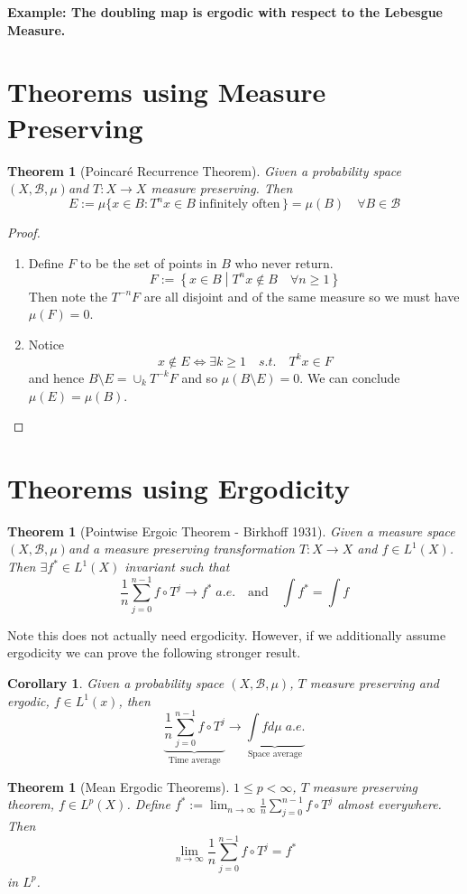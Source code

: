 \documentclass[11pt]{article}
\newcommand{\defeq}{:=}
\newcommand{\msrspc}{\ensuremath{(X,\mathcal{B},\mu)}}
\newcommand{\relmiddle}[1]{\mathrel{}\middle#1\mathrel{}}
\newcommand{\rmv}{\relmiddle|}
\newenvironment{eg}
	{\begin{mdframed}[backgroundcolor=mylg,roundcorner=5pt,linewidth=0pt]\bfseries{Example:}\normalfont}
	{\end{mdframed}}
\newtheorem{theorem}[prop]{Theorem}
\newtheorem{cor}[prop]{Corollary}
\begin{document}
\begin{eg}
	\textbf{The doubling map is ergodic with respect to the Lebesgue Measure.}
\end{eg}

\section{Theorems using Measure Preserving}
\begin{theorem}[Poincar\'e Recurrence Theorem]
	Given a probability space \msrspc and $T:X\to X$ measure preserving. Then
	$$E\defeq\mu\{x\in B : T^nx\in B \; \text{infinitely often}\,\}=\mu(B)\quad \forall B\in\mathcal{B}$$
\end{theorem}

\begin{proof}
\begin{enumerate}
	\item Define $F$ to be the set of points in $B$ who never return.
		\[
			F\defeq \left\{ x\in B \rmv T^nx\not\in B \quad \forall n\geq 1\right\}
		\]
		Then note the $T^{-n}F$ are all disjoint and of the same measure so we must have $\mu(F) = 0$.
	\item Notice
		\[
			x\not \in E \iff \exists k \geq 1 \quad s.t. \quad T^kx \in F
		\]
		and hence $B\setminus E = \cup_k T^{-k}F$ and so $\mu(B \setminus E) = 0$.
		We can conclude $\mu(E) = \mu(B)$.
\end{enumerate}
\end{proof}

\section{Theorems using Ergodicity}
\begin{theorem}[Pointwise Ergoic Theorem - Birkhoff 1931]
	Given a measure space \msrspc and a measure preserving transformation $T:X \to X$ and $f\in L^1(X)$. Then $\exists f^*\in L^1(X)$ invariant such that
	$$\frac{1}{n}\sum_{j=0}^{n-1}f\circ T^j \to f^* \; a.e.\quad \text{and} \quad \int f^* = \int f$$
\end{theorem}
Note this does not actually need ergodicity. However, if we additionally assume ergodicity we can prove the following stronger result.
\begin{cor}
Given a probability space \msrspc, $T$ measure preserving and ergodic, $f\in L^1(x)$, then
$$\underbrace{\frac{1}{n}\sum_{j=0}^{n-1}f\circ T^j }_{\text{Time average}}\to \underbrace{\int f d\mu \; a.e.}_{\text{Space average}}$$
\end{cor}
\begin{theorem}[Mean Ergodic Theorems]
	$1\leq p < \infty$, $T$ measure preserving theorem, $f\in L^p(X)$. Define $f^*\defeq \lim_{n\to\infty} \frac{1}{n}\sum_{j=0}^{n-1}f\circ T^j$ almost everywhere. Then
	$$\lim_{n\to\infty}\frac{1}{n}\sum_{j=0}^{n-1}f\circ T^j = f^*$$
	in $L^p$.
\end{theorem}
\end{document}
